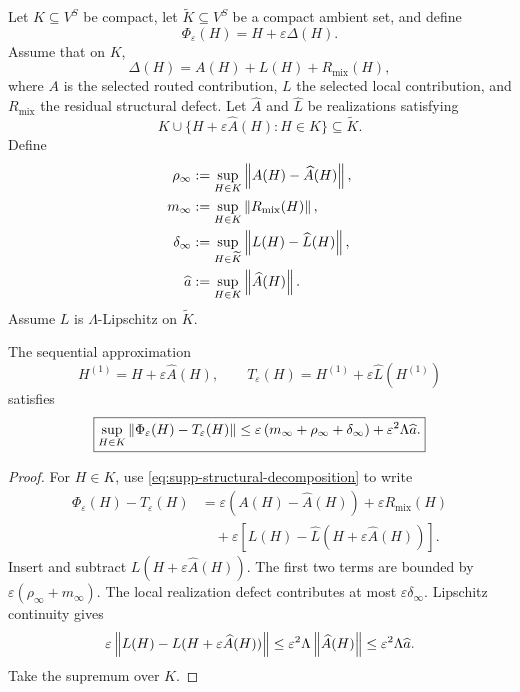 Let $K\subseteq V^S$ be compact, let $\widetilde K\subseteq V^S$ be a compact ambient set, and define
\[
\Phi_\varepsilon(H)=H+\varepsilon\Delta(H).
\]
Assume that on $K$,
\begin{equation}\label{eq:supp-structural-decomposition}
\Delta(H)
=
A(H)+L(H)+R_{\mathrm{mix}}(H),
\end{equation}
where $A$ is the selected routed contribution, $L$ the selected local contribution, and $R_{\mathrm{mix}}$ the residual structural defect. Let $\widehat A$ and $\widehat L$ be realizations satisfying
\[
K\cup
\{H+\varepsilon\widehat A(H):H\in K\}
\subseteq\widetilde K.
\]
Define
\[
\begin{aligned}
\rho_\infty
&:=
\sup_{H\in K}\left\lVert A(H)-\widehat A(H)\right\rVert,\\
m_\infty
&:=
\sup_{H\in K}\left\lVert R_{\mathrm{mix}}(H)\right\rVert,\\
\delta_\infty
&:=
\sup_{H\in\widetilde K}\left\lVert L(H)-\widehat L(H)\right\rVert,\\
\widehat a
&:=
\sup_{H\in K}\left\lVert \widehat A(H)\right\rVert.
\end{aligned}
\]
Assume $L$ is $\Lambda$-Lipschitz on $\widetilde K$.

\begin{theorem}\label{thm:supp-staged-approximation}
The sequential approximation
\[
H^{(1)}=H+\varepsilon\widehat A(H),
\qquad
T_\varepsilon(H)
=
H^{(1)}+\varepsilon\widehat L(H^{(1)})
\]
satisfies
\[
\boxed{
\sup_{H\in K}
\left\lVert \Phi_\varepsilon(H)-T_\varepsilon(H)\right\rVert
\le
\varepsilon
\left(
 m_\infty+\rho_\infty+\delta_\infty
\right)
+
\varepsilon^2\Lambda\widehat a.
}
\]
\end{theorem}

\begin{proof}
For $H\in K$, use \eqref{eq:supp-structural-decomposition} to write
\[
\begin{aligned}
\Phi_\varepsilon(H)-T_\varepsilon(H)
&=
\varepsilon(A(H)-\widehat A(H))
+
\varepsilon R_{\mathrm{mix}}(H)\\
&\quad+
\varepsilon
\left[
L(H)-\widehat L(H+\varepsilon\widehat A(H))
\right].
\end{aligned}
\]
Insert and subtract $L(H+\varepsilon\widehat A(H))$. The first two terms are bounded by $\varepsilon(\rho_\infty+m_\infty)$. The local realization defect contributes at most $\varepsilon\delta_\infty$. Lipschitz continuity gives
\[
\varepsilon
\left\lVert L(H)-L(H+\varepsilon\widehat A(H))\right\rVert
\le
\varepsilon^2\Lambda\left\lVert \widehat A(H)\right\rVert
\le
\varepsilon^2\Lambda\widehat a.
\]
Take the supremum over $K$.
\end{proof}

